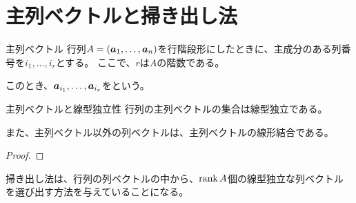 \documentclass[../../../topic_linear-algebra]{subfiles}
\begin{document}
\sectionline
\section{主列ベクトルと掃き出し法}

\begin{definition}{主列ベクトル}\label{def:pivot-columns}
  行列$A = (\vb*{a}_1, \dots, \vb*{a}_n)$を行階段形にしたときに、主成分のある列番号を$i_1,\dots, i_r$とする。
  ここで、$r$は$A$の階数である。

  このとき、$\vb*{a}_{i_1}, \dots, \vb*{a}_{i_r}$をという。
\end{definition}

\br

\begin{theorem}{主列ベクトルと線型独立性}
  行列の主列ベクトルの集合は線型独立である。

  また、主列ベクトル以外の列ベクトルは、主列ベクトルの線形結合である。
\end{theorem}

\begin{proof}
\end{proof}

\br

掃き出し法は、行列の列ベクトルの中から、$\rank A$個の線型独立な列ベクトルを選び出す方法を与えていることになる。
\end{document}
